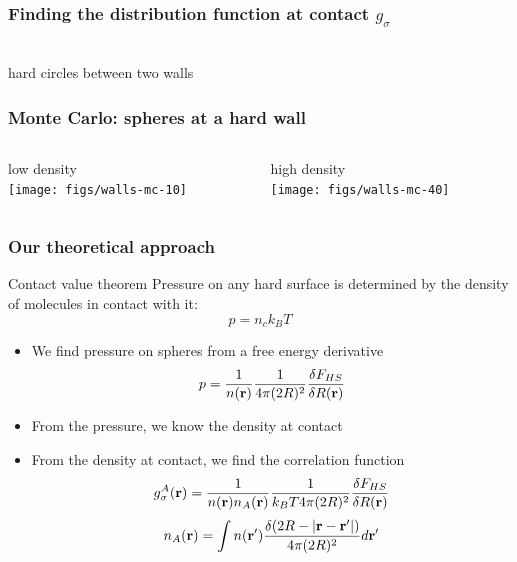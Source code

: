 \begin{frame}
  \frametitle{Finding the distribution function at contact $g_\sigma$}
  \vspace{-0.8em}
  \begin{center}
    \\
    \vspace{-0.5em}
    hard circles between two walls
  \end{center}
\end{frame}

\begin{frame}
  \frametitle{Monte Carlo:  spheres at a hard wall}
  \begin{columns}
    \begin{column}{0.5\columnwidth}
      \begin{center}
        low density\\
        \texttt{[image: figs/walls-mc-10]}
      \end{center}
    \end{column}
    \begin{column}{0.5\columnwidth}
      \begin{center}
        high density\\
        \texttt{[image: figs/walls-mc-40]}
      \end{center}
    \end{column}
  \end{columns}
\end{frame}

\begin{frame}
  \frametitle{Our theoretical approach}
  \begin{block}{Contact value theorem}
    Pressure on any hard surface is determined by the density of
    molecules in contact with it:
    \vspace{-1em}
    \[ p = n_{c}k_BT \]
    \vspace{-2em}
    \begin{itemize}
    \item We find pressure on spheres from a free energy derivative
      \vspace{-0.5em}
      \[p = \frac{1}{n(\mathbf{r})}\frac{1}{4\pi(2R)^2}\frac{\delta F_{HS}}{\delta R(\mathbf{r})}\]
    \item From the pressure, we know the density at contact
    \item From the density at contact, we find the correlation
      function
      \vspace{-0.5em}
      \[g_\sigma^A(\mathbf{r})
      = \frac{1}{n(\mathbf{r}) n_A(\mathbf{r})}\frac{1}{ k_BT 4\pi (2R)^2} \frac{\delta
        F_{HS}}{\delta R(\mathbf{r})}\]
      \[
      n_A(\mathbf{r}) = \int n(\mathbf{r}')
      \frac{\delta(2R -|\mathbf{r}-\mathbf{r}'|)}{4\pi(2R)^2} d\mathbf{r}' \label{eq:nA}
      \]
    \end{itemize}
  \end{block}
\end{frame}

